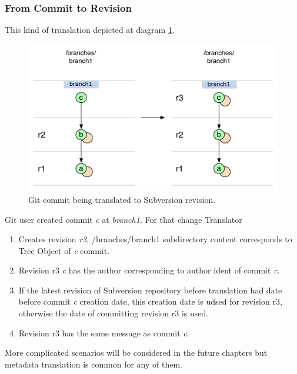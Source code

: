 \subsubsection{From Commit to Revision}

This kind of translation depicted at diagram \ref{single_change_git_to_svn}.

\begin{figure}[!h]
\centering
\renewcommand{\figurename}{Diagram}
\includegraphics[width=\linewidth]{img/diagrams/single_change_git_to_svn.pdf}
\caption{Git commit being translated to Subversion revision.}
\label{single_change_git_to_svn}
\end{figure}

Git user created commit \emph{c} at \emph{branch1}. For that change Translator
\begin{enumerate}
	\item Creates revision \emph{r3}, /branches/branch1 subdirectory content corresponds to Tree Object of \emph{c} commit.
	\item Revision r3 \emph{c} has the author corresponding to author ident of commit \emph{c}.
	\item If the latest revision of Subversion repository before translation had date before commit \emph{c} creation date, this creation date is udsed for revision r3, otherwise the date of committing revision r3 is used.
	\item Revision r3 has the same message as commit \emph{c}.
\end{enumerate}

More complicated scenarios will be considered in the future chapters but metadata translation is common for any of them.